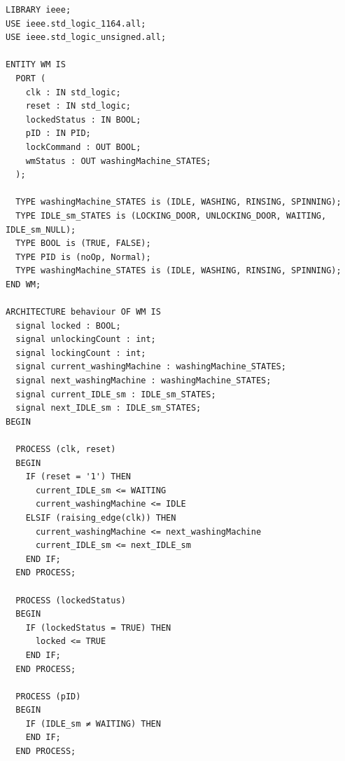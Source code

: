 \begin{verbatim}
LIBRARY ieee;
USE ieee.std_logic_1164.all;
USE ieee.std_logic_unsigned.all;

ENTITY WM IS
  PORT (
    clk : IN std_logic;
    reset : IN std_logic;
    lockedStatus : IN BOOL;
    pID : IN PID;
    lockCommand : OUT BOOL;
    wmStatus : OUT washingMachine_STATES;
  );

  TYPE washingMachine_STATES is (IDLE, WASHING, RINSING, SPINNING);
  TYPE IDLE_sm_STATES is (LOCKING_DOOR, UNLOCKING_DOOR, WAITING, IDLE_sm_NULL);
  TYPE BOOL is (TRUE, FALSE);
  TYPE PID is (noOp, Normal);
  TYPE washingMachine_STATES is (IDLE, WASHING, RINSING, SPINNING);
END WM;

ARCHITECTURE behaviour OF WM IS
  signal locked : BOOL;
  signal unlockingCount : int;
  signal lockingCount : int;
  signal current_washingMachine : washingMachine_STATES;
  signal next_washingMachine : washingMachine_STATES;
  signal current_IDLE_sm : IDLE_sm_STATES;
  signal next_IDLE_sm : IDLE_sm_STATES;
BEGIN

  PROCESS (clk, reset)
  BEGIN
    IF (reset = '1') THEN
      current_IDLE_sm <= WAITING
      current_washingMachine <= IDLE
    ELSIF (raising_edge(clk)) THEN
      current_washingMachine <= next_washingMachine
      current_IDLE_sm <= next_IDLE_sm
    END IF;
  END PROCESS;

  PROCESS (lockedStatus)
  BEGIN
    IF (lockedStatus = TRUE) THEN
      locked <= TRUE
    END IF;
  END PROCESS;

  PROCESS (pID)
  BEGIN
    IF (IDLE_sm ≠ WAITING) THEN
    END IF;
  END PROCESS;


\end{verbatim}
